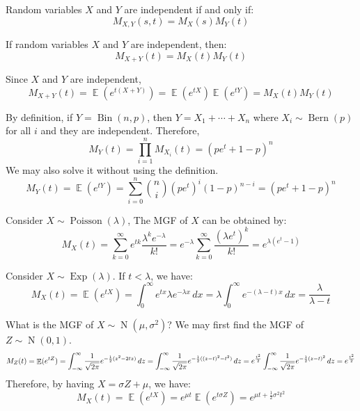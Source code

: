 \documentclass{huhtakm-template-book-v2}
\DeclareMathOperator{\E}{\mathbb{E}}
\DeclareMathOperator{\Bern}{Bern}
\DeclareMathOperator{\Bin}{Bin}
\DeclareMathOperator{\Poisson}{Poisson}
\DeclareMathOperator{\Exp}{Exp}
\DeclareMathOperator{\N}{N}
\begin{document}
\begin{lem}
	Random variables $X$ and $Y$ are independent if and only if:
	\begin{equation*}
		M_{X,Y}(s,t)=M_{X}(s)M_{Y}(t)
	\end{equation*}
\end{lem}
\begin{lem}
	If random variables $X$ and $Y$ are independent, then:
	\begin{equation*}
		M_{X+Y}(t)=M_{X}(t)M_{Y}(t)
	\end{equation*}
\end{lem}
\begin{proofing}
	Since $X$ and $Y$ are independent,
	\begin{equation*}
		M_{X+Y}(t)=\E(e^{t(X+Y)})=\E(e^{tX})\E(e^{tY})=M_{X}(t)M_{Y}(t)
	\end{equation*}
\end{proofing}
\begin{eg}
	By definition, if $Y=\Bin(n,p)$, then $Y=X_{1}+\cdots+X_{n}$ where $X_{i}\sim\Bern(p)$ for all $i$ and they are independent. Therefore,
	\begin{equation*}
		M_{Y}(t)=\prod_{i=1}^{n}M_{X_{i}}(t)=(pe^{t}+1-p)^{n}
	\end{equation*}
	We may also solve it without using the definition.
	\begin{equation*}
		M_{Y}(t)=\E(e^{tY})=\sum_{i=0}^{n}\binom{n}{i}(pe^{t})^{i}(1-p)^{n-i}=(pe^{t}+1-p)^{n}
	\end{equation*}
\end{eg}
\begin{eg}
	Consider $X\sim\Poisson(\lambda)$, The MGF of $X$ can be obtained by:
	\begin{equation*}
		M_{X}(t)=\sum_{k=0}^{\infty}e^{tk}\frac{\lambda^{k}e^{-\lambda}}{k!}=e^{-\lambda}\sum_{k=0}^{\infty}\frac{(\lambda e^{t})^{k}}{k!}=e^{\lambda(e^{t}-1)}
	\end{equation*}
\end{eg}
\begin{eg}
	Consider $X\sim\Exp(\lambda)$. If $t<\lambda$, we have:
	\begin{equation*}
		M_{X}(t)=\E(e^{tX})=\int_{0}^{\infty}e^{tx}\lambda e^{-\lambda x}\,dx=\lambda\int_{0}^{\infty}e^{-(\lambda-t)x}\,dx=\frac{\lambda}{\lambda-t}
	\end{equation*}
\end{eg}
\begin{eg}
	What is the MGF of $X\sim\N(\mu,\sigma^{2})$? We may first find the MGF of $Z\sim\N(0,1)$.
	\begin{align*}
		M_{Z}(t)=\E(e^{tZ})=\intinfty\frac{1}{\sqrt{2\pi}}e^{-\frac{1}{2}(z^{2}-2tz)}\,dz=\intinfty\frac{1}{\sqrt{2\pi}}e^{-\frac{1}{2}((z-t)^{2}-t^{2})}\,dz=e^{\frac{t^{2}}{2}}\intinfty\frac{1}{\sqrt{2\pi}}e^{-\frac{1}{2}(z-t)^{2}}\,dz=e^{\frac{t^{2}}{2}}
	\end{align*}
	Therefore, by having $X=\sigma Z+\mu$, we have:
	\begin{equation*}
		M_{X}(t)=\E(e^{tX})=e^{\mu t}\E(e^{t\sigma Z})=e^{\mu t+\frac{1}{2}\sigma^{2}t^{2}}
	\end{equation*}
\end{eg}
\end{document}

